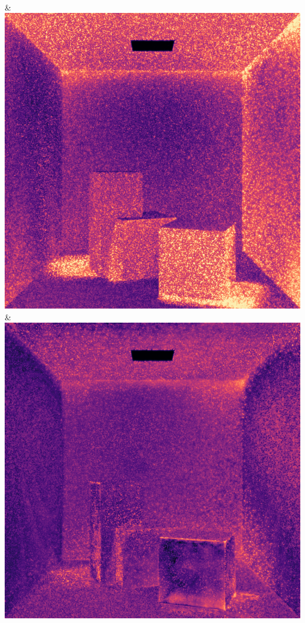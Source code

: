 \\
& \includegraphics[width=\linewidth]{figures/py/tests/quality_comparison/pt_1spp_flip.png}
& \includegraphics[width=\linewidth]{figures/py/tests/quality_comparison/nrc+pt_1spp_flip.png}
